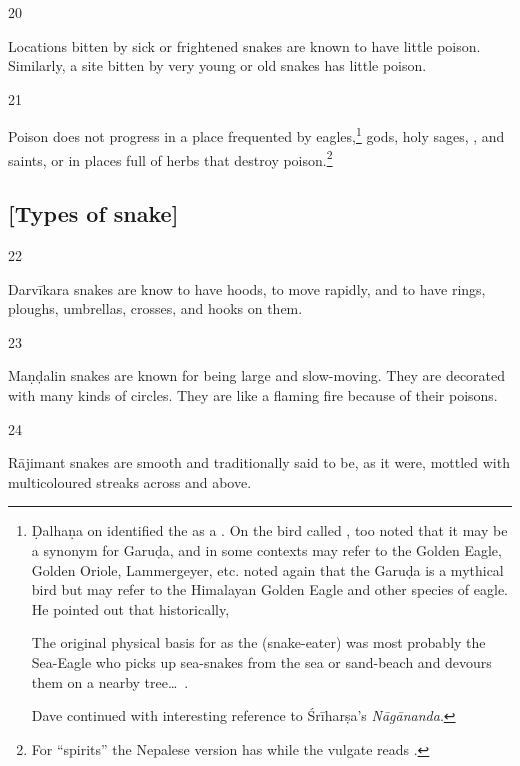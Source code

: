 \begin{translation}
\item [20]

Locations bitten by sick or frightened snakes are known to have little poison.  
Similarly, a site bitten by very young or old snakes has little poison.

\item [21]

Poison does not progress in a place frequented by
eagles,\footnote{Ḍalhaṇa on  identified the 
    as a . On the bird called , \citet[72\,ff,
    514]{dave} too noted that it may be a synonym for Garuḍa,
    and in some contexts may refer to the Golden Eagle, Golden
    Oriole, Lammergeyer, etc. \citet[199\,ff, 492]{dave} noted again that the
    Garuḍa is a mythical bird but may refer to the Himalayan Golden Eagle and
    other species of eagle.  He pointed out that historically,
    \begin{quoting}
        The original physical basis for  as the 
    (snake-eater) was most probably the Sea-Eagle who picks up sea-snakes
    from the sea or sand-beach and devours them on a nearby tree\ldots\  
    \citep[201]{dave}.
    \end{quoting} Dave
    continued with interesting reference to Śrīharṣa's \emph{Nāgānanda}.}
    gods, holy sages, \diff{spirits}, and saints, or in places full of herbs
    that destroy poison.\footnote{For “spirits” the Nepalese version has
        \dev{bhūta} while the vulgate reads \dev{yakṣa}.}

\subsection{[Types of snake]}

\item [22]

Darvīkara snakes are know to have hoods, to move rapidly, and to have rings, 
ploughs, umbrellas, crosses, and hooks on them.


\item [23]

Maṇḍalin snakes are known for being large and slow-moving.  They are 
decorated with many kinds of circles. 
They are like a flaming fire because of their poisons.


\item [24]

Rājimant snakes are smooth and traditionally said to be, as it were,
mottled with multicoloured streaks across and above.


\end{translation}
